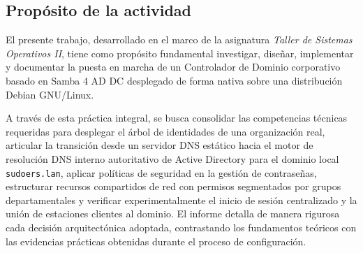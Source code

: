 \subsection{Propósito de la actividad}

El presente trabajo, desarrollado en el marco de la asignatura \textit{Taller de Sistemas Operativos II}, tiene como propósito fundamental investigar, diseñar, implementar y documentar la puesta en marcha de un Controlador de Dominio corporativo basado en Samba 4 AD DC desplegado de forma nativa sobre una distribución Debian GNU/Linux. 

A través de esta práctica integral, se busca consolidar las competencias técnicas requeridas para desplegar el árbol de identidades de una organización real, articular la transición desde un servidor DNS estático hacia el motor de resolución DNS interno autoritativo de Active Directory para el dominio local \texttt{sudoers.lan}, aplicar políticas de seguridad en la gestión de contraseñas, estructurar recursos compartidos de red con permisos segmentados por grupos departamentales y verificar experimentalmente el inicio de sesión centralizado y la unión de estaciones clientes al dominio. El informe detalla de manera rigurosa cada decisión arquitectónica adoptada, contrastando los fundamentos teóricos con las evidencias prácticas obtenidas durante el proceso de configuración.